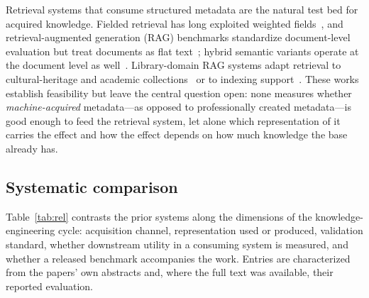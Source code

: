 Retrieval systems that consume structured metadata are the natural test bed
for acquired knowledge. Fielded retrieval has long exploited weighted
fields~\cite{bm25f, prf_bm25}, and retrieval-augmented generation (RAG)
benchmarks standardize document-level evaluation but treat documents as
flat text~\cite{bergen}; hybrid semantic variants operate at the document
level as well~\cite{hysemrag}. Library-domain RAG systems adapt retrieval to
cultural-heritage and academic collections~\cite{folkrag,
lund_rag_libraries, historical_archives_rag, icadl_ephemeral} or to
indexing support~\cite{alima, koha_marc21_hitl}. These works establish
feasibility but leave the central question open: none measures whether
\textit{machine-acquired} metadata---as opposed to professionally created
metadata---is good enough to feed the retrieval system, let alone which
representation of it carries the effect and how the effect depends on how
much knowledge the base already has.

\subsection{Systematic comparison}
\label{sec:rel:table}

Table~\ref{tab:rel} contrasts the prior systems along the dimensions of the
knowledge-engineering cycle: acquisition channel, representation used or
produced, validation standard, whether downstream utility in a consuming
system is measured, and whether a released benchmark accompanies the work.
Entries are characterized from the papers' own abstracts and, where the
full text was available, their reported evaluation.

